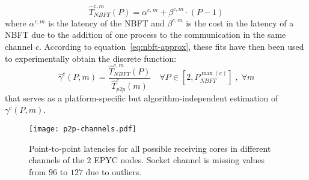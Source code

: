 \documentclass[../main.tex]{subfiles}
\begin{document}
\begin{equation}\label{eq:nbft-fit}
    \widehat{T}_{NBFT}^{c,m}(P) = \alpha^{c,m} + \beta^{c,m} \cdot (P-1)
\end{equation}
where $\alpha^{c,m}$ is the latency of the NBFT and $\beta^{c,m}$ is the cost in the latency of a NBFT due to the addition of one process to the communication in the same channel $c$. According to equation~\ref{eq:nbft-approx}, these fits have then been used to experimentally obtain the discrete function:
\begin{equation}\label{eq:gamma-discrete}
    \widehat{\gamma}^{c}(P,m) = \frac{\widehat{T}_{NBFT}^{c,m}(P)}{\widehat{T}^{c}_{p2p}(m)} \quad \forall P \in [2,P^{\max(c)}_{NBFT}]\;,\;\forall m
\end{equation}
that serves as a platform-specific but algorithm-independent estimation of $\gamma^{c}(P,m)$.
\begin{figure}[h]
    \centering
    \texttt{[image: p2p-channels.pdf]}
    \caption{Point-to-point latencies for all possible receiving cores in different channels of the $2$ EPYC nodes. Socket channel is missing values from $96$ to $127$ due to outliers.}
    \label{fig:p2p-channels}
\end{figure}
\end{document}
